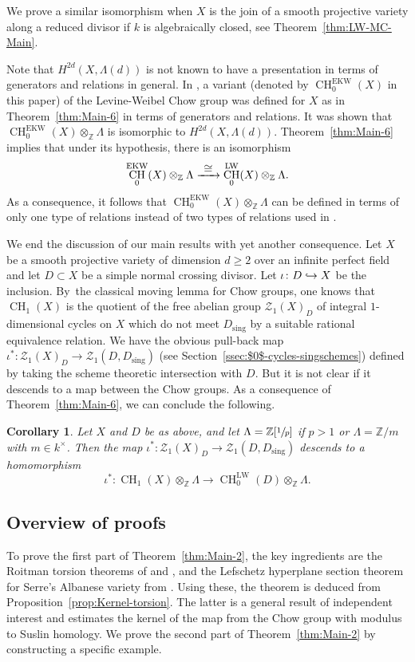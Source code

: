 \documentclass[11pt]{article}
\numberwithin{equation}{section}
\let\mathcal\mathscr
\def\hto{\mathrel{\lhook\joinrel\to}}
\def\To#1{\mathchoice{\xrightarrow{\textstyle\kern4pt#1\kern3pt}}{\stackrel{#1}{\longrightarrow}}{}{}}
\let\inj\hto
\newcommand{\EKW}{\mathrm{EKW}}
\newcommand{\LW}{\mathrm{LW}}
\newtheorem{cor}[thm]{Corollary}
\theoremstyle{definition}
\newcommand{\thmref}{Theorem~\ref}
\newcommand{\propref}{Proposition~\ref}
\newcommand{\secref}{Section~\ref}
\newcommand{\sZ}{{\mathcal Z}}
\newcommand{\Z}{{\mathbb Z}}
\DeclareMathOperator{\CH}{CH}
\newcommand{\sing}{\mathrm{sing}}
\begin{document}
We prove a similar isomorphism when $X$ is the join of a smooth
projective variety along a reduced divisor if $k$ is algebraically closed,
see \thmref{thm:LW-MC-Main}.

Note that $H^{2d}(X, \Lambda(d))$ is not known to have a presentation in terms
of generators and relations in general. In \cite[Th.\,7.1]{EKW},
a variant (denoted by $\CH^{\EKW}_0(X)$ in this paper)
of the Levine-Weibel Chow group
was defined for $X$ as in \thmref{thm:Main-6}
in terms of generators and relations. It was shown that
$\CH^{\EKW}_0(X) \otimes_{\Z} \Lambda$ is isomorphic to $H^{2d}(X, \Lambda(d))$.
\thmref{thm:Main-6} implies that under its hypothesis, there is an isomorphism
\[
\CH^{\EKW}_0(X) \otimes_{\Z} \Lambda \To{\cong} \CH^{\LW}_0(X) \otimes_{\Z} \Lambda.
\]
As a consequence, it follows that $\CH^{\EKW}_0(X) \otimes_{\Z} \Lambda$
can be defined in terms
of only one type of relations instead of two types of relations used in
\cite{EKW}.

We end the discussion of our main results with yet another consequence.
Let $X$ be a smooth projective variety of dimension $d \ge 2$
over an infinite
perfect field and let $D \subset X$ be a simple normal crossing divisor.
Let $\iota \colon D \inj X$ be the inclusion.
By~the classical moving lemma for Chow groups, one knows that $\CH_1(X)$
is the quotient of the free abelian group $\sZ_1(X)_D$ of integral
$1$-dimensional cycles on $X$ which do not meet $D_\sing$ by a suitable
rational equivalence relation. We have the obvious pull-back map
$\iota^* \colon \sZ_1(X)_D \to \sZ_1(D, D_\sing)$
(see \secref{ssec:$0$-cycles-singschemes}) defined by taking the
scheme theoretic intersection with $D$. But it is not clear if
it descends to a map between the Chow groups.
As a consequence of \thmref{thm:Main-6}, we can conclude the following.

\begin{cor}\label{cor:Main-8}Let $X$ and $D$ be as above, and let $\Lambda = \Z[\sfrac{1}{p}]$ if $p>1$ or $\Lambda = {\Z}/m$ with $m \in k^{\times}$. Then
the map $\iota^* \colon \sZ_1(X)_D \to \sZ_1(D, D_\sing)$ descends to a
homomorphism
\[
\iota^* \colon \CH_1(X) \otimes_{\Z} \Lambda \to \CH^{\LW}_0(D)\otimes_{\Z} \Lambda.
\]
\end{cor}

\subsection{Overview of proofs}\label{sec:proofs}
To prove the first part of \thmref{thm:Main-2}, the key ingredients are the Roitman
torsion theorems of \cite{Krishna-2} and \cite{SS}, and the Lefschetz hyperplane
section theorem for Serre's Albanese variety from \cite{GK-1}.
Using these, the theorem is deduced from \propref{prop:Kernel-torsion}.
The latter is a general result of independent interest and estimates the kernel
of the map from the Chow group with modulus to Suslin homology.
We prove the second part of \thmref{thm:Main-2} by constructing a specific example.
\end{document}

